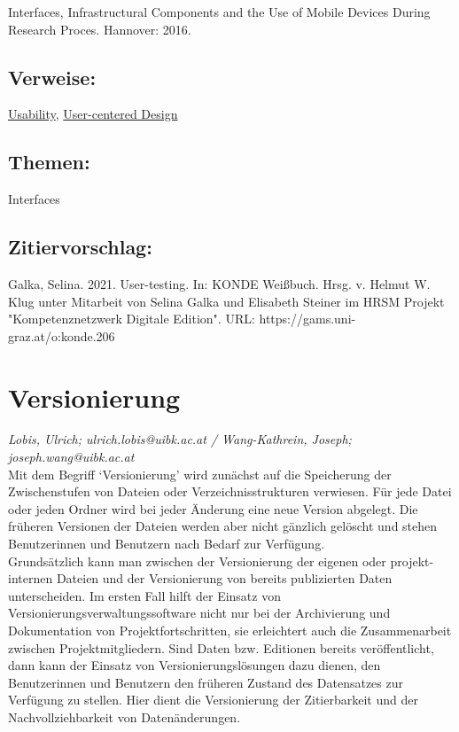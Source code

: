 \documentclass{article}
\begin{document}
\begin{itemize}
                              Interfaces, Infrastructural Components and the Use of Mobile Devices
                              During Research Proces. Hannover: 2016.\end{itemize}\subsection*{Verweise:}\href{https://gams.uni-graz.at/o:konde.205}{Usability}, \href{https://gams.uni-graz.at/o:konde.207}{User-centered Design}\subsection*{Themen:}Interfaces\subsection*{Zitiervorschlag:}Galka, Selina. 2021. User-testing. In: KONDE Weißbuch. Hrsg. v. Helmut W. Klug unter Mitarbeit von Selina Galka und Elisabeth Steiner im HRSM Projekt "Kompetenznetzwerk Digitale Edition". URL: https://gams.uni-graz.at/o:konde.206\newpage\section*{Versionierung} \emph{Lobis, Ulrich; ulrich.lobis@uibk.ac.at / Wang-Kathrein, Joseph; joseph.wang@uibk.ac.at}\\
        
    Mit dem Begriff ‘Versionierung’ wird zunächst auf die Speicherung der Zwischenstufen von Dateien oder Verzeichnisstrukturen verwiesen. Für jede Datei oder jeden Ordner wird bei jeder Änderung eine neue Version abgelegt. Die früheren Versionen der Dateien werden aber nicht gänzlich gelöscht und stehen Benutzerinnen und Benutzern nach Bedarf zur Verfügung.\\
            
        Grundsätzlich kann man zwischen der Versionierung der eigenen oder projekt-internen Dateien und der Versionierung von bereits publizierten Daten unterscheiden. Im ersten Fall hilft der Einsatz von Versionierungsverwaltungssoftware nicht nur bei der Archivierung und Dokumentation von Projektfortschritten, sie erleichtert auch die Zusammenarbeit zwischen Projektmitgliedern. Sind Daten bzw. Editionen bereits veröffentlicht, dann kann der Einsatz von Versionierungslösungen dazu dienen, den Benutzerinnen und Benutzern den früheren Zustand des Datensatzes zur Verfügung zu stellen. Hier dient die Versionierung der Zitierbarkeit und der Nachvollziehbarkeit von Datenänderungen.\\
            
\end{document}
